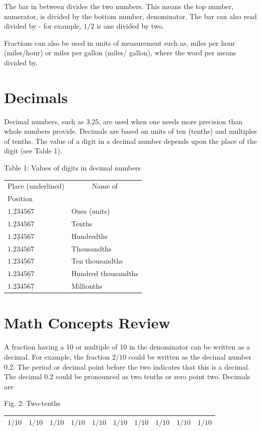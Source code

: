 \documentclass[10pt]{article}
\begin{document}
The bar in between divides the two numbers. This means the top number, numerator, is divided by the bottom number, denominator. The bar can also read divided by - for example, $1 / 2$ is one divided by two.

Fractions can also be used in units of measurement such as, miles per hour (miles/hour) or miles per gallon (miles/ gallon), where the word per means divided by.

\section{Decimals}
Decimal numbers, such as $3.25$, are used when one needs more precision than whole numbers provide. Decimals are based on units of ten (tenths) and multiples of tenths. The value of a digit in a decimal number depends upon the place of the digit (see Table 1).

Table 1: Values of digits in decimal numbers

\begin{tabular}{|ll}
\multicolumn{1}{c}{Place (underlined)} & \multicolumn{1}{c}{Name of} \\
Position &  \\
$\underline{1.234567}$ & Ones (units) \\
$1 . \underline{2} 34567$ & Tenths \\
$1.2 \underline{3} 4567$ & Hundredths \\
$1.23 \underline{4567}$ & Thousandths \\
$1.234 \underline{5} 67$ & Ten thousandths \\
$1.2345 \underline{6} 7$ & Hundred thousandths \\
$1.23456 \underline{7}$ & Millionths \\
\hline
\end{tabular}

\section{Math Concepts Review}
A fraction having a 10 or multiple of 10 in the denominator can be written as a decimal. For example, the fraction $2 / 10$ could be written as the decimal number 0.2. The period or decimal point before the two indicates that this is a decimal. The decimal $0.2$ could be pronounced as two tenths or zero point two. Decimals are

Fig. 2: Two-tenths

\begin{tabular}{|l|l|l|l|l|l|l|l|l|l|}
\hline
$1 / 10$ & $1 / 10$ & $1 / 10$ & $1 / 10$ & $1 / 10$ & $1 / 10$ & $1 / 10$ & $1 / 10$ & $1 / 10$ & $1 / 10$ \\
\hline
\end{tabular}
\end{document}
